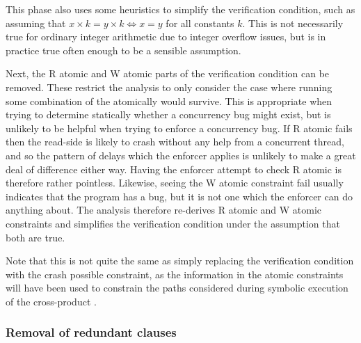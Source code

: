 This phase also uses some heuristics to simplify the verification
condition, such as assuming that $x {\times} k = y {\times} k
\Leftrightarrow x = y$ for all constants $k$.  This is not necessarily
true for ordinary integer arithmetic due to integer overflow issues,
but is in practice true often enough to be a sensible assumption.

Next, the R atomic and W atomic parts of the verification condition
can be removed.  These restrict the analysis to only consider the case
where running some combination of the {\StateMachines} atomically
would survive.  This is appropriate when trying to determine
statically whether a concurrency bug might exist, but is unlikely to
be helpful when trying to enforce a concurrency bug.  If R atomic
fails then the read-side is likely to crash without any help from a
concurrent thread, and so the pattern of delays which the enforcer
applies is unlikely to make a great deal of difference either way.
Having the enforcer attempt to check R atomic is therefore rather
pointless.  Likewise, seeing the W atomic constraint fail usually
indicates that the program has a bug, but it is not one which the
enforcer can do anything about.  The analysis therefore re-derives R
atomic and W atomic constraints and simplifies the verification
condition under the assumption that both are true.

Note that this is not quite the same as simply replacing the
verification condition with the crash possible constraint, as the
information in the atomic constraints will have been used to constrain
the paths considered during symbolic execution of the cross-product
{\StateMachine}.  


\subsubsection{Removal of redundant clauses}


